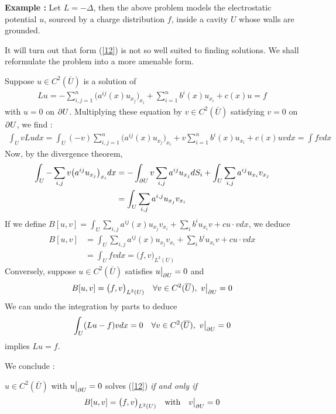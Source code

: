 \documentclass[12pt,a4paper]{report}
\begin{document}
\textbf{Example :} Let $L=-\Delta$, then the above problem models the electrostatic potential $u$, sourced by a charge distribution $f$, inside a cavity $U$ whose walls are grounded.
\s

It will turn out that form (\ref{12}) is not so well suited to finding solutions. We shall reformulate the problem into a more amenable form.

\quad Suppose $u\in C^2(\bar{U})$ is a solution of
\begin{align*}
Lu = - \sum_{i,j=1}^n \big( a^{ij}(x) u_{x_j} \big)_{x_i} + \sum_{i=1}^n b^i (x) u_{x_i} + c(x)u = f
\end{align*}
with $u=0$ on $\partial U$. Multiplying these equation by $v\in C^2(\bar{U})$ satisfying $v=0$ on $\partial U$, we find :
\begin{align*}
\int_U vLu dx = \int_U (-v) \sum_{i,j=1}^n \big( a^{ij}(x) u_{x_j} \big)_{x_i} + v\sum_{i=1}^n b^i (x) u_{x_i} + c(x)u v dx = \int fv dx
\end{align*}
Now, by the divergence theorem,
\begin{align*}
\int_U -\sum_{i,j} v\big(a^{ij}u_{x_j}\big)_{x_i} dx &= - \int_{\partial U} v \sum_{i,j} a^{ij} u_{x_j} dS_i + \int_U \sum_{i,j} a^{ij} u_{x_i} v_{x_j} \\
&= \int_U \sum_{i,j} a^{i,j} u_{x_j} v_{x_i}
\end{align*}
If we define $B[u,v] = \int_U \sum_{i,j} a^{ij}(x) u_{x_j} v_{x_i} + \sum_{i} b^i u_{x_i} v + cu\cdot v dx$, we deduce 
\begin{align*}
B[u,v] &= \int_U \sum_{i,j} a^{ij}(x) u_{x_j} v_{x_i} + \sum_{i} b^i u_{x_i} v + cu\cdot v dx \\
&= \int_U fv dx = \big(f,v \big)_{L^2(U)} 
\end{align*}
Conversely, suppose $u\in C^2(\bar{U})$ satisfies $u\big|_{\partial U} = 0$ and
\begin{align*}
B[u,v] = \big( f,v \big)_{L^2(U)} \quad \forall v \in C^2(\overline{U}), \,\, v\big|_{\partial U} =0
\end{align*}
We can undo the integration by parts to deduce
\begin{align*}
\int_U (Lu -f) v dx =0 \quad \forall v \in C^2(\overline{U}), \,\, v\big|_{\partial U} =0
\end{align*}
implies $Lu=f$.
\s

We conclude :

\quad $u \in C^2(\bar{U})$ with $u \big|_{\partial U} =0$ solves (\ref{12}) \emph{if and only if}
\begin{align*}
B[u,v] = \big( f,v \big)_{L^2(U)} \quad \text{with} \quad v\big|_{\partial U} = 0
\end{align*}
\s
\end{document}

